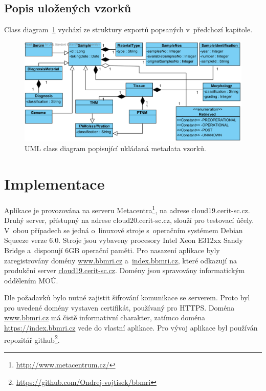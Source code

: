 \documentclass[11pt, final, oneside]{fithesis2}
\begin{document}
\section{Popis uložených vzorků}
Class diagram~\ref{fig:index:uml:class:sample} vychází ze struktury exportů popsaných v~předchozí kapitole.

\begin{figure}[h!]
\centering
	\includegraphics[width=\textwidth]{SampleView}
\caption{UML class diagram popisující ukládaná metadata vzorků.}
\label{fig:index:uml:class:sample}
\end{figure}

\chapter{Implementace}\label{chapter:implementation}
Aplikace je provozována na serveru Metacentra\footnote{\url{http://www.metacentrum.cz/}}, na adrese cloud19.cerit-sc.cz. Druhý server, přístupný na adrese cloud20.cerit-sc.cz, slouží pro testovací účely. V~obou případech se jedná o~linuxové stroje s~operačním systémem Debian Squeeze verze 6.0. Stroje jsou vybaveny procesory Intel Xeon E312xx Sandy Bridge a~disponují 6GB operační paměti. Pro nasazení aplikace byly zaregistrovány domény \url{www.bbmri.cz} a~\url{index.bbmri.cz}, které odkazují na produkční server \url{cloud19.cerit-sc.cz}. Domény jsou spravovány informatickým oddělením MOÚ.

Dle požadavků bylo nutné zajistit šifrování komunikace se serverem. Proto byl pro uvedené domény vystaven certifikát, používaný pro HTTPS. 
Doména \url{www.bbmri.cz} má čistě informativní charakter, zatímco doména \url{https://index.bbmri.cz} vede do vlastní aplikace.
Pro vývoj aplikace byl používán repozitář github\footnote{\url{https://github.com/Ondrej-vojtisek/bbmri}}. 
\end{document}
